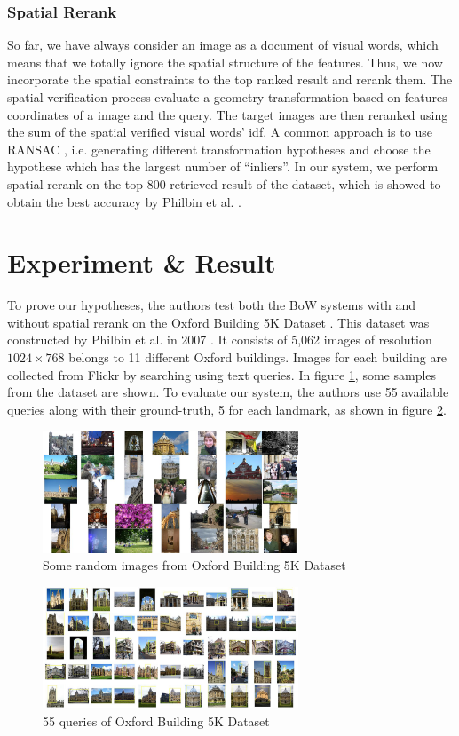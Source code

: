 \documentclass[10pt,conference,]{IEEEtran}
\begin{document}
\subsubsection{Spatial Rerank} \label{section:spatial_rerank}

So far, we have always consider an image as a document of visual words, which means that we totally ignore the spatial structure of the features. Thus, we now incorporate the spatial constraints to the top ranked result and rerank them. The spatial verification process evaluate a geometry transformation based on features coordinates of a image and the query. The target images are then reranked using the sum of the spatial verified visual words' idf. A common approach is to use RANSAC \cite{Fischler1981}, i.e. generating different transformation hypotheses and choose the hypothese which has the largest number of ``inliers''. In our system, we perform spatial rerank on the top 800 retrieved result of the dataset, which is showed to obtain the best accuracy by Philbin et al. \cite{2}.

\section{Experiment \& Result} \label{section:experiment_result}

To prove our hypotheses, the authors test both the BoW systems with and without spatial rerank on the Oxford Building 5K Dataset \cite{oxbuilding}. This dataset was constructed by Philbin et al. in 2007 \cite{2}. It consists of 5,062 images of resolution $1024 \times 768$ belongs to 11 different Oxford buildings. Images for each building are collected from Flickr by searching using text queries. In figure \ref{fig:oxbuilding}, some samples from the dataset are shown. To evaluate our system, the authors use 55 available queries along with their ground-truth, 5 for each landmark, as shown in figure \ref{fig:oxbuilding_query}. 

\begin{figure}
    \centering
    \includegraphics[width=3.0in]{oxbuilding.jpg}
    \caption{Some random images from Oxford Building 5K Dataset}
    \label{fig:oxbuilding}
\end{figure}

\begin{figure}
    \centering
    \includegraphics[width=3.0in]{oxbuilding_query.jpg}
    \caption{55 queries of Oxford Building 5K Dataset}
    \label{fig:oxbuilding_query}
\end{figure}




\end{document}
